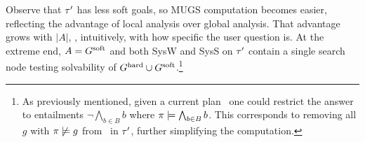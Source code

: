 %
%
%
%
%

Observe that $\tau'$ has less soft goals, so MUGS computation becomes
easier, reflecting the advantage of local analysis over global
analysis. That advantage grows with $|A|$, \ie, intuitively, with how
specific the user question is. At the extreme end, $A = G^{\text{\textup{soft}}}$ and
both SysW and SysS on $\tau'$ contain a single search node testing
solvability of $G^{\text{\textup{hard}}} \cup G^{\text{\textup{soft}}}$.\footnote{As previously
  mentioned, given a current plan \plan\ one could restrict the answer
  to entailments $\neg \bigwedge_{b \in B} b$ where $\pi \models
  \bigwedge_{b \in B} b$. This corresponds to removing all $g$ with
  $\pi \not\models g$ from \goalsoft\ in $\tau'$, further
  simplifying the computation.}
















